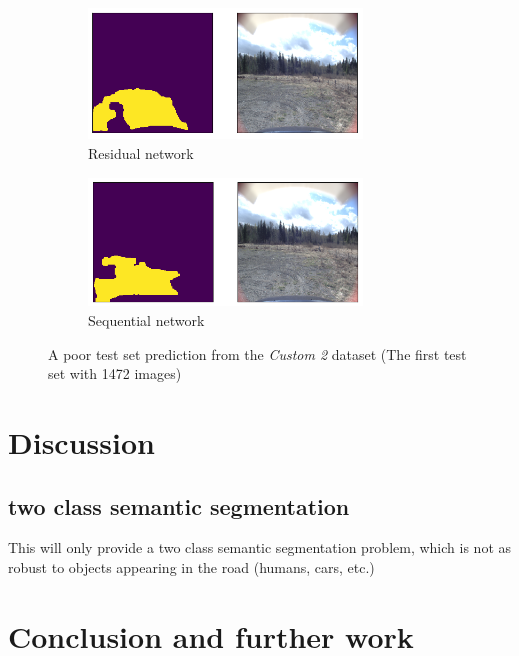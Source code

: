 \documentclass[USenglish]{ifimaster}  %
\begin{document}
\begin{figure}[H]
\centering
\begin{subfigure}[b]{\textwidth}
\centering
\includegraphics[width=0.8\textwidth]{bilder/custom_2/154_res_poor.png}
\caption{Residual network}
\label{fig:custom_2_poor_res}
\end{subfigure}
\hfill
\begin{subfigure}[b]{\textwidth}
\centering
\includegraphics[width=0.8\textwidth]{bilder/custom_2/154_seq_poor.png}
\caption{Sequential network}
\label{fig:custom_2_poor_seq}
\end{subfigure}
\caption{A poor test set prediction from the \textit{Custom 2} dataset (The first test set with 1472 images)}
\end{figure}

\chapter{Discussion}
\section{two class semantic segmentation}
This will only provide a two class semantic segmentation problem, which is not as robust to objects appearing in the road (humans, cars, etc.) 

\chapter{Conclusion and further work}



\backmatter{}
\printbibliography
\end{document}
